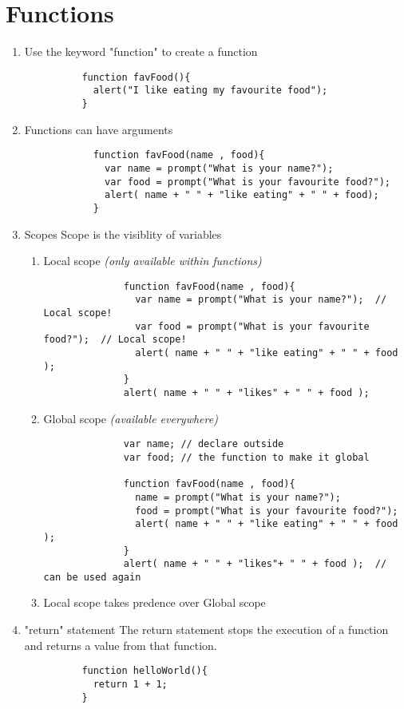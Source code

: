 \documentclass{article}
\begin{document}
  \section{Functions}
    \begin{enumerate}
      \item Use the keyword "function" to create a function
        \begin{lstlisting}
          function favFood(){
            alert("I like eating my favourite food");
          }
        \end{lstlisting}
      \item Functions can have arguments
          \begin{lstlisting}
            function favFood(name , food){
              var name = prompt("What is your name?");
              var food = prompt("What is your favourite food?");
              alert( name + " " + "like eating" + " " + food);
            }
          \end{lstlisting}
      \item Scopes
        Scope is the visiblity of variables
        \begin{enumerate}
          \item Local scope \emph{(only available within functions)}
            \begin{lstlisting}
              function favFood(name , food){
                var name = prompt("What is your name?");  // Local scope!
                var food = prompt("What is your favourite food?");  // Local scope!
                alert( name + " " + "like eating" + " " + food );
              }
              alert( name + " " + "likes" + " " + food );
            \end{lstlisting}
          \item Global scope \emph{(available everywhere)}
            \begin{lstlisting}
              var name; // declare outside
              var food; // the function to make it global

              function favFood(name , food){
                name = prompt("What is your name?");
                food = prompt("What is your favourite food?");
                alert( name + " " + "like eating" + " " + food );
              }
              alert( name + " " + "likes"+ " " + food );  // can be used again
            \end{lstlisting}
          \item Local scope takes predence over Global scope
        \end{enumerate}
      \item "return" statement
      The return statement stops the execution of a function and returns a value from that function.
        \begin{lstlisting}
          function helloWorld(){
            return 1 + 1;
          }
        \end{lstlisting}
    \end{enumerate}
\end{document}
